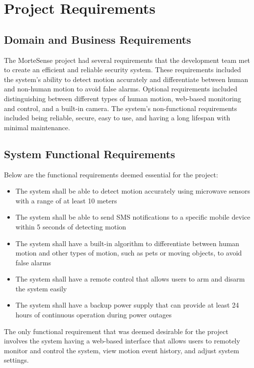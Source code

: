 \section{Project Requirements}\label{sec:project-requirements}

\subsection{Domain and Business Requirements}\label{subsec:domain-and-business-requirements}
The MorteSense project had several requirements that the development team met to
create an efficient and reliable security system. %
These requirements included the system's ability to detect motion accurately and differentiate between human and
non-human motion to avoid false alarms. %
Optional requirements included distinguishing between different types of human motion, web-based monitoring and control, and a
built-in camera. %
The system's non-functional requirements included being reliable, secure,
easy to use, and having a long lifespan with minimal maintenance. %

\subsection{System Functional Requirements}\label{subsec:system-functional-requirements}

Below are the functional requirements deemed essential for the project:
\begin{itemize}
    \item The system shall be able to detect motion accurately using microwave sensors with a range of at least 10 meters
    \item The system shall be able to send SMS notifications to a specific mobile device within 5 seconds of detecting motion
    \item The system shall have a built-in algorithm to differentiate between human motion and other types of motion, such as pets or moving objects, to avoid false alarms
    \item The system shall have a remote control that allows users to arm and disarm the system easily
    \item The system shall have a backup power supply that can provide at least 24 hours of continuous operation during power outages
\end{itemize}

The only functional requirement that was deemed desirable for the project involves the
system having a web-based interface that allows users to remotely monitor and control the
system, view motion event history, and adjust system settings. %


